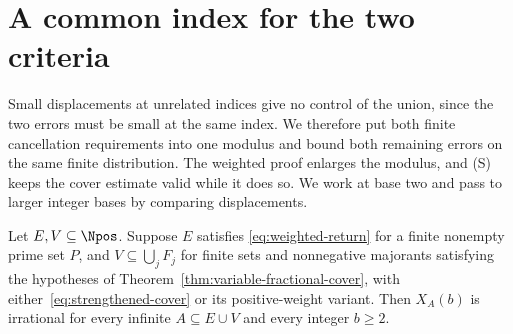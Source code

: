 \documentclass[11pt]{article}
\begin{document}
\section{A common index for the two criteria}\label{sec:mixed}
Small displacements at unrelated indices give no control of the union,
since the two errors must be small at the same index. We therefore put
both finite cancellation requirements into one modulus and bound both
remaining errors on the same finite distribution. The weighted proof
enlarges the modulus, and (S) keeps the cover estimate valid while it
does so. We work at base two and pass to larger integer bases by
comparing displacements.
\begin{samepage}
\begin{theorem}\label{res:mixed-supports}
Let $E,V\subseteq\Npos$.  Suppose $E$ satisfies
\eqref{eq:weighted-return} for a finite nonempty prime set $P$, and
$V\subseteq\bigcup_jF_j$ for finite sets and nonnegative majorants
satisfying the hypotheses of Theorem~\ref{thm:variable-fractional-cover},
with either~\eqref{eq:strengthened-cover} or its positive-weight variant.
Then $X_A(b)$ is irrational for every
infinite $A\subseteq E\cup V$ and every integer $b\ge2$.
\end{theorem}
\end{samepage}
\end{document}
